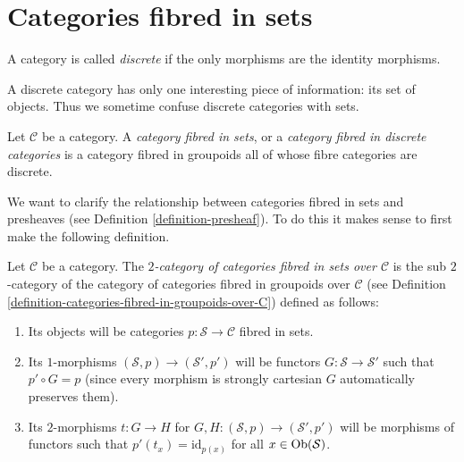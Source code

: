 \section{Categories fibred in sets}
\label{section-fibred-in-sets}

\begin{definition}
\label{definition-discrete}
A category is called {\it discrete} if the only morphisms are the identity
morphisms.
\end{definition}

\noindent
A discrete category has only one interesting piece of information:
its set of objects. Thus we sometime confuse discrete categories
with sets.

\begin{definition}
\label{definition-category-fibred-sets}
Let $\mathcal{C}$ be a category.
A {\it category fibred in sets}, or a {\it category fibred
in discrete categories} is a category fibred in groupoids all
of whose fibre categories are discrete.
\end{definition}

\noindent
We want to clarify the relationship between categories fibred in sets
and presheaves (see Definition \ref{definition-presheaf}).
To do this it makes sense to first make the following definition.

\begin{definition}
\label{definition-categories-fibred-in-sets-over-C}
Let $\mathcal{C}$ be a category.
The {\it $2$-category of categories fibred in sets over $\mathcal{C}$}
is the sub $2$-category of the category of categories fibred in groupoids
over $\mathcal{C}$ (see
Definition \ref{definition-categories-fibred-in-groupoids-over-C})
defined as follows:
\begin{enumerate}
\item Its objects will be categories
$p : \mathcal{S} \to \mathcal{C}$ fibred in sets.
\item Its $1$-morphisms $(\mathcal{S}, p) \to (\mathcal{S}', p')$
will be functors $G : \mathcal{S} \to \mathcal{S}'$ such that
$p' \circ G = p$ (since every morphism is strongly cartesian
$G$ automatically preserves them).
\item Its $2$-morphisms $t : G \to H$ for
$G, H : (\mathcal{S}, p) \to (\mathcal{S}', p')$
will be morphisms of functors
such that $p'(t_x) = \text{id}_{p(x)}$
for all $x \in \mathop{\mathrm{Ob}}\nolimits(\mathcal{S})$.
\end{enumerate}
\end{definition}

